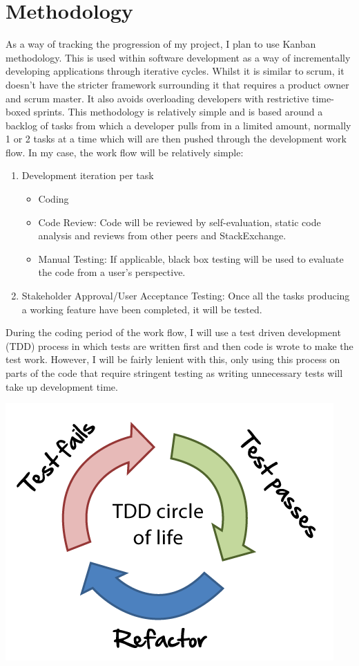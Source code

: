 \documentclass[]{report}
\begin{document}
	\section{Methodology}
			As a way of tracking the progression of my project, I plan to use Kanban methodology. This is used within software development as a way of incrementally developing applications through iterative cycles. Whilst it is similar to scrum, it doesn't have the stricter framework surrounding it that requires a product owner and scrum master. It also avoids overloading developers with restrictive time-boxed sprints. This methodology is relatively simple and is based around a backlog of tasks from which a developer pulls from in a limited amount, normally 1 or 2 tasks at a time which will are then pushed through the development work flow. In my case, the work flow will be relatively simple:
			\begin{enumerate}
				\item Development iteration per task
				\begin{itemize}
					\item Coding
					\item Code Review: Code will be reviewed by self-evaluation, static code analysis and reviews from other peers and StackExchange.
					\item Manual Testing: If applicable, black box testing will be used to evaluate the code from a user's perspective.
				\end{itemize}
				\item Stakeholder Approval/User Acceptance Testing: Once all the tasks producing a working feature have been completed, it will be tested. 
			\end{enumerate}
		During the coding period of the work flow, I will use a test driven development (TDD) process in which tests are written first and then code is wrote to make the test work. However, I will be fairly lenient with this, only using this process on parts of the code that require stringent testing as writing unnecessary tests will take up development time. 
		\begin{center}
			\includegraphics[scale=0.5]{tdd-circle-of-life.png}
		\end{center}
		
\end{document}
